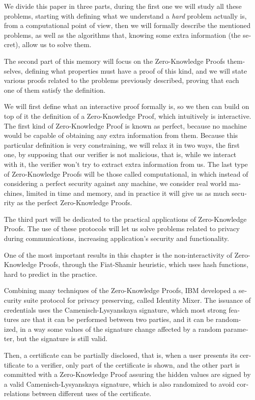 \begin{otherlanguage}{english}
We divide this paper in three parts, during the first one we will study all these problems, starting with defining what we understand a \textit{hard} problem actually is, from a computational point of view, then we will formally describe the mentioned problems, as well as the algorithms that, knowing some extra information (the secret), allow us to solve them.

The second part of this memory will focus on the Zero-Knowledge Proofs themselves, defining what properties must have a proof of this kind, and we will state various proofs related to the problems previously described, proving that each one of them satisfy the definition.

We will first define what an interactive proof formally is, so we then can build on top of it the definition of a Zero-Knowledge Proof, which intuitively is interactive. The first kind of Zero-Knowledge Proof is known as perfect, because no machine would be capable of obtaining any extra information from them. Because this particular definition is very constraining, we will relax it in two ways, the first one, by supposing that our verifier is not malicious, that is, while we interact with it, the verifier won't try to extract extra information from us. The last type of Zero-Knowledge Proofs will be those called computational, in which instead of considering a perfect security against any machine, we consider real world machines, limited in time and memory, and in practice it will give us as much security as the perfect Zero-Knowledge Proofs.


The third part will be dedicated to the practical applications of Zero-Knowledge Proofs. The use of these protocols will let us solve problems related to privacy during communications, increasing application's security and functionality.

One of the most important results in this chapter is the non-interactivity of Zero-Knowledge Proofs, through the Fiat-Shamir heuristic, which uses hash functions, hard to predict in the practice.

Combining many techniques of the Zero-Knowledge Proofs, IBM developed a security suite protocol for privacy preserving, called Identity Mixer. The issuance of credentials uses the Camenisch-Lysyanskaya signature, which most strong features are that it can be performed between two parties, and it can be randomized, in a way some values of the signature change affected by a random parameter, but the signature is still valid.

Then, a certificate can be partially disclosed, that is, when a user presents its certificate to a verifier, only part of the certificate is shown, and the other part is committed with a Zero-Knowledge Proof assuring the hidden values are signed by a valid Camenisch-Lysyanskaya signature, which is also randomized to avoid correlations between different uses of the certificate.


\end{otherlanguage}
